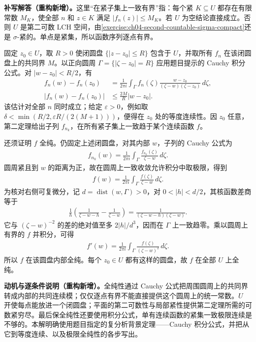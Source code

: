 \documentclass[../../main.tex]{subfiles}%
\begin{document}
\begin{solution}
\textbf{补写解答（重构新增）。}这里“在紧子集上一致有界”指：每个紧 $K\subseteq U$ 都存在有限常数 $M_K$，使全部 $n$ 和 $z\in K$ 满足 $|f_n(z)|\le M_K$。若 $U$ 为空结论直接成立。否则 $U$ 是第二可数 LCH 空间，由\cref{exercise:ch04-second-countable-sigma-compact}还是 $\sigma$-紧的。单点是紧集，所以函数序列逐点有界。

固定 $z_0\in U$，取 $R>0$ 使闭圆盘 $\{|z-z_0|\le R\}$ 包含于 $U$，并取所有 $f_n$ 在该闭圆盘上的共同界 $M$。以正向圆周 $\Gamma=\{|\zeta-z_0|=R\}$ 应用题目提示的 Cauchy 积分公式。对 $|w-z_0|<R/2$，有
\begin{align*}
f_n(w)-f_n(z_0)
&=\frac{1}{2\pi i}\int_\Gamma f_n(\zeta)
\frac{w-z_0}{(\zeta-w)(\zeta-z_0)}\,d\zeta,\\
|f_n(w)-f_n(z_0)|&\le\frac{2M}{R}|w-z_0|.
\end{align*}
该估计对全部 $n$ 同时成立；给定 $\varepsilon>0$，例如取 $\delta<\min(R/2,\varepsilon R/(2(M+1)))$，便得在 $z_0$ 处的等度连续性。因 $z_0$ 任意，第二定理给出子列 $f_{n_k}$，在所有紧子集上一致趋于某个连续函数 $f$。

还须证明 $f$ 全纯。仍固定上述闭圆盘，对其内部 $w$，子列的 Cauchy 公式为
\begin{align*}
f_{n_k}(w)=\frac{1}{2\pi i}\int_\Gamma\frac{f_{n_k}(\zeta)}{\zeta-w}\,d\zeta.
\end{align*}
圆周紧且到 $w$ 的距离为正，故在圆周上一致收敛允许积分中取极限，得到
\begin{align*}
f(w)=\frac{1}{2\pi i}\int_\Gamma\frac{f(\zeta)}{\zeta-w}\,d\zeta.
\end{align*}
为核对右侧可复微分，记 $d=\operatorname{dist}(w,\Gamma)>0$，对 $0<|h|<d/2$，其核函数差商等于
\begin{align*}
\frac{1}{h}\left(\frac1{\zeta-w-h}-\frac1{\zeta-w}\right)
=\frac1{(\zeta-w-h)(\zeta-w)}.
\end{align*}
它与 $(\zeta-w)^{-2}$ 的差的绝对值至多 $2|h|/d^3$，因而在 $\Gamma$ 上一致趋零。乘以圆周上有界的 $f$ 并积分，可得
\begin{align*}
f'(w)=\frac{1}{2\pi i}\int_\Gamma\frac{f(\zeta)}{(\zeta-w)^2}\,d\zeta.
\end{align*}
所以 $f$ 在该圆盘内部全纯。每个 $z_0\in U$ 都有这样的圆盘，故 $f$ 在全部 $U$ 上全纯。
\end{solution}
\begin{remark}
\textbf{动机与逐条件说明（重构新增）。}全纯性通过 Cauchy 公式把周围圆周上的共同界转成内部的共同连续模；仅仅逐点有界不能直接提供这个圆周上的统一常数。$U$ 开使每点能放进一个闭圆盘；平面的第二可数性与局部紧性提供第二定理所需的可数紧穷尽。最后保全纯性还要使用积分公式，单有连续函数的紧集一致极限连续是不够的。本解明确使用题目指定的复分析背景定理——Cauchy 积分公式，并把从它到等度连续、以及极限全纯性的各步写出。
\end{remark}
\end{document}
